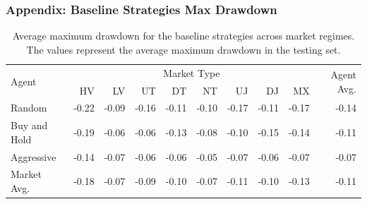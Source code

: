 \documentclass{beamer}
\begin{document}
\begin{frame}
  \frametitle{Appendix: Baseline Strategies Max Drawdown}

  \begin{table}[htbp]
    \fontsize{7}{9}\selectfont
    \centering
    \caption[Baseline Strategies Max Drawdown]{Average maximum drawdown for the baseline strategies across market regimes. The values represent the average maximum drawdown in the testing set.}
    \begin{tabular}{l|rrrrrrrr|r}
    \hline
    \multirow{2}{*}{Agent} & \multicolumn{8}{c|}{Market Type} & \multirow{2}{*}{Agent Avg.} \\
    \cline{2-9}
    & HV &  LV &  UT &  DT &  NT &  UJ &  DJ & MX \\
    \hline
    Random       &     -0.22 &    -0.09 &     -0.16 &       -0.11 &     -0.10 &    -0.17 &      -0.11 &  -0.17 &       -0.14 \\
    Buy and Hold &     -0.19 &    -0.06 &     -0.06 &       -0.13 &     -0.08 &    -0.10 &      -0.15 &  -0.14 &       -0.11 \\
    Aggressive   &     -0.14 &    -0.07 &     -0.06 &       -0.06 &     -0.05 &    -0.07 &      -0.06 &  -0.07 &       -0.07 \\
    \hline
    Market Avg.  &     -0.18 &    -0.07 &     -0.09 &       -0.10 &     -0.07 &    -0.11 &      -0.10 &  -0.13 &       -0.11 \\
    \end{tabular}
    \label{tab:baseline_max_drawdown}
  \end{table}

\end{frame}
\end{document}
